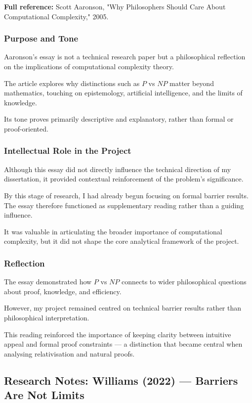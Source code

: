 \documentclass[12pt]{article}
\begin{document}
\textbf{Full reference:} Scott Aaronson,
"Why Philosophers Should Care About Computational Complexity,"
2005.

\subsubsection*{Purpose and Tone}

Aaronson's essay is not a technical research paper but a philosophical reflection on the implications of computational complexity theory.

The article explores why distinctions such as $P$ vs $NP$ matter beyond mathematics, touching on epistemology, artificial intelligence, and the limits of knowledge.

Its tone proves primarily descriptive and explanatory, rather than formal or proof-oriented.

\subsubsection*{Intellectual Role in the Project}

Although this essay did not directly influence the technical direction of my dissertation, it provided contextual reinforcement of the problem's significance.

By this stage of research, I had already begun focusing on formal barrier results. The essay therefore functioned as supplementary reading rather than a guiding influence.

It was valuable in articulating the broader importance of computational complexity, but it did not shape the core analytical framework of the project.

\subsubsection*{Reflection}

The essay demonstrated how $P$ vs $NP$ connects to wider philosophical questions about proof, knowledge, and efficiency.

However, my project remained centred on technical barrier results rather than philosophical interpretation.

This reading reinforced the importance of keeping clarity between intuitive appeal and formal proof constraints --- a distinction that became central when analysing relativisation and natural proofs.

\subsection{Research Notes: Williams (2022) --- Barriers Are Not Limits}
\end{document}
